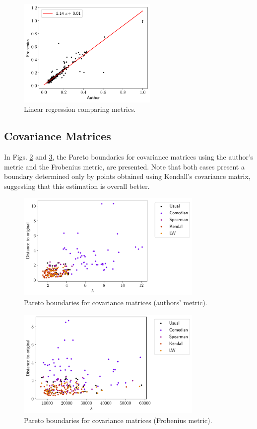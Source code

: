 \documentclass[11pt]{article}
\theoremstyle{definition}
\theoremstyle{remark}
\theoremstyle{remark}
\theoremstyle{remark}
\begin{document}
\begin{figure}[H]
  \centering \includegraphics[width=0.6\textwidth]{figs/linear.pdf}
  \caption{Linear regression comparing metrics.}
  \label{fig:linear}
\end{figure}

\subsection{Covariance Matrices}

In Figs. \ref{fig:paretocova} and \ref{fig:paretocovf}, the Pareto boundaries
for covariance matrices using the author's metric and the Frobenius metric, are
presented. Note that both cases present a boundary determined only by points
obtained using Kendall's covariance matrix, suggesting that this estimation is
overall better.

\begin{figure}[H]
  \centering \includegraphics[width=0.8\textwidth]{figs/author-scatter.pdf}
  \caption{Pareto boundaries for covariance matrices (authors' metric).}
  \label{fig:paretocova}
\end{figure}

\begin{figure}[H]
  \centering \includegraphics[width=0.8\textwidth]{figs/fro-scatter.pdf}
  \caption{Pareto boundaries for covariance matrices (Frobenius metric).}
  \label{fig:paretocovf}
\end{figure}
\end{document}
